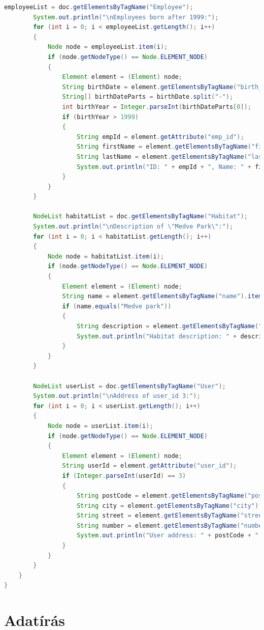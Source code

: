 \documentclass[12pt]{report}
\begin{document}
\begin{lstlisting}[caption={DOMQueryKLNSPG.java} olvasó program, language=Java]
		employeeList = doc.getElementsByTagName("Employee");
		System.out.println("\nEmployees born after 1999:");
		for (int i = 0; i < employeeList.getLength(); i++)
		{
			Node node = employeeList.item(i);
			if (node.getNodeType() == Node.ELEMENT_NODE)
			{
				Element element = (Element) node;
				String birthDate = element.getElementsByTagName("birth_date").item(0).getTextContent();
				String[] birthDateParts = birthDate.split("-");
				int birthYear = Integer.parseInt(birthDateParts[0]);
				if (birthYear > 1999)
				{
					String empId = element.getAttribute("emp_id");
					String firstName = element.getElementsByTagName("first_name").item(0).getTextContent();
					String lastName = element.getElementsByTagName("last_name").item(0).getTextContent();
					System.out.println("ID: " + empId + ", Name: " + firstName + " " + lastName + ", Birth Date: " + birthDate);
				}
			}
		}
		
		NodeList habitatList = doc.getElementsByTagName("Habitat");
		System.out.println("\nDescription of \"Medve Park\":");
		for (int i = 0; i < habitatList.getLength(); i++)
		{
			Node node = habitatList.item(i);
			if (node.getNodeType() == Node.ELEMENT_NODE)
			{
				Element element = (Element) node;
				String name = element.getElementsByTagName("name").item(0).getTextContent();
				if (name.equals("Medve park"))
				{
					String description = element.getElementsByTagName("description").item(0).getTextContent();
					System.out.println("Habitat description: " + description);
				}
			}
		}
		
		NodeList userList = doc.getElementsByTagName("User");
		System.out.println("\nAddress of user_id 3:");
		for (int i = 0; i < userList.getLength(); i++)
		{
			Node node = userList.item(i);
			if (node.getNodeType() == Node.ELEMENT_NODE)
			{
				Element element = (Element) node;
				String userId = element.getAttribute("user_id");
				if (Integer.parseInt(userId) == 3)
				{
					String postCode = element.getElementsByTagName("post_code").item(0).getTextContent();
					String city = element.getElementsByTagName("city").item(0).getTextContent();
					String street = element.getElementsByTagName("street").item(0).getTextContent();
					String number = element.getElementsByTagName("number").item(0).getTextContent();
					System.out.println("User address: " + postCode + " " + city + " " + street + " " + number);
				}
			}
		}
	}
}
\end{lstlisting}

\section{Adatírás}
\end{document}
